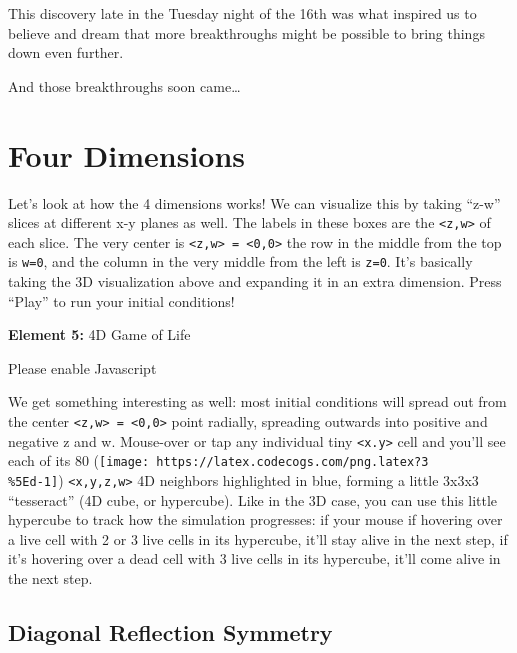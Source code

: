 \documentclass[]{article}
\begin{document}
This discovery late in the Tuesday night of the 16th was what inspired us to
believe and dream that more breakthroughs might be possible to bring things down
even further.

And those breakthroughs soon came\ldots{}

\hypertarget{four-dimensions}{%
\section{Four Dimensions}\label{four-dimensions}}

Let's look at how the 4 dimensions works! We can visualize this by taking
``z-w'' slices at different x-y planes as well. The labels in these boxes are
the \texttt{\textless{}z,w\textgreater{}} of each slice. The very center is
\texttt{\textless{}z,w\textgreater{}\ =\ \textless{}0,0\textgreater{}} the row
in the middle from the top is \texttt{w=0}, and the column in the very middle
from the left is \texttt{z=0}. It's basically taking the 3D visualization above
and expanding it in an extra dimension. Press ``Play'' to run your initial
conditions!

\leavevmode\hypertarget{gol4D}{}%
\textbf{Element 5:} 4D Game of Life

\leavevmode\hypertarget{gol4DCont}{}%
Please enable Javascript

We get something interesting as well: most initial conditions will spread out
from the center
\texttt{\textless{}z,w\textgreater{}\ =\ \textless{}0,0\textgreater{}} point
radially, spreading outwards into positive and negative z and w. Mouse-over or
tap any individual tiny \texttt{\textless{}x.y\textgreater{}} cell and you'll
see each of its 80
(\texttt{[image: https://latex.codecogs.com/png.latex?3\\\%5Ed-1]})
\texttt{\textless{}x,y,z,w\textgreater{}} 4D neighbors highlighted in blue,
forming a little 3x3x3 ``tesseract'' (4D cube, or hypercube). Like in the 3D
case, you can use this little hypercube to track how the simulation progresses:
if your mouse if hovering over a live cell with 2 or 3 live cells in its
hypercube, it'll stay alive in the next step, if it's hovering over a dead cell
with 3 live cells in its hypercube, it'll come alive in the next step.

\hypertarget{diagonal-reflection-symmetry}{%
\subsection{Diagonal Reflection Symmetry}\label{diagonal-reflection-symmetry}}
\end{document}
